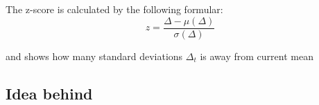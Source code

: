 \documentclass[12pt]{article}
\begin{document}
The z-score is calculated by the following formular:
\begin{equation}
  z = \frac{\Delta - \mu(\Delta)}{\sigma(\Delta)}
\end{equation}

and shows how many standard deviations $\Delta_t$ is away from current mean	  










\subsubsection{}

\subsubsection{}














\newpage


\subsection{Idea behind}
\end{document}
